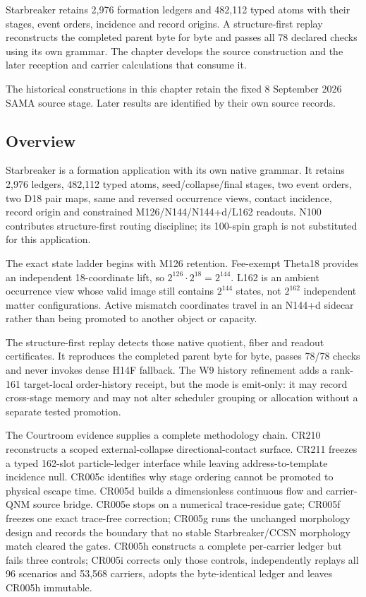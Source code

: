 \label{viii-ch08-starbreaker-formation-on-its-own-grammar}

Starbreaker retains 2,976 formation ledgers and 482,112 typed atoms with their stages, event orders, incidence and record origins. A structure-first replay reconstructs the completed parent byte for byte and passes all 78 declared checks using its own grammar. The chapter develops the source construction and the later reception and carrier calculations that consume it.

The historical constructions in this chapter retain the fixed 8 September 2026 SAMA source stage. Later results are identified by their own source records.

\subsection{Overview}\label{viii-ch08-overview}

Starbreaker is a formation application with its own native grammar. It
retains 2,976 ledgers, 482,112 typed atoms, seed/collapse/final stages,
two event orders, two D18 pair maps, same and reversed occurrence views,
contact incidence, record origin and constrained M126/N144/N144+d/L162
readouts. N100 contributes structure-first routing discipline; its
100-spin graph is not substituted for this application.

The exact state ladder begins with M126 retention. Fee-exempt Theta18
provides an independent 18-coordinate lift, so
\(2^{126}\cdot2^{18}=2^{144}\). L162 is an ambient occurrence view whose
valid image still contains \(2^{144}\) states, not \(2^{162}\)
independent matter configurations. Active mismatch coordinates travel in
an N144+d sidecar rather than being promoted to another object or
capacity.

The structure-first replay detects those native quotient, fiber and
readout certificates. It reproduces the completed parent byte for byte,
passes 78/78 checks and never invokes dense H14F fallback. The W9
history refinement adds a rank-161 target-local order-history receipt,
but the mode is emit-only: it may record cross-stage memory and may not
alter scheduler grouping or allocation without a separate tested
promotion.

The Courtroom evidence supplies a complete methodology chain. CR210
reconstructs a scoped external-collapse directional-contact surface.
CR211 freezes a typed 162-slot particle-ledger interface while leaving
address-to-template incidence null. CR005c identifies why stage ordering
cannot be promoted to physical escape time. CR005d builds a
dimensionless continuous flow and carrier-QNM source bridge. CR005e
stops on a numerical trace-residue gate; CR005f freezes one exact
trace-free correction; CR005g runs the unchanged morphology design and
records the boundary that no stable Starbreaker/CCSN morphology match
cleared the gates. CR005h constructs a complete per-carrier ledger but
fails three controls; CR005i corrects only those controls, independently
replays all 96 scenarios and 53,568 carriers, adopts the byte-identical
ledger and leaves CR005h immutable.

